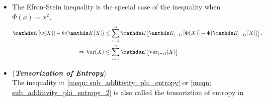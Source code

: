 \documentclass[11pt]{article}
\begin{document}
\begin{itemize}
\begin{proof}
\begin{align*}
\text{Ent}(X)&:= \E{}{X\log X} - \E{}{X}\log\paren{\E{}{X}} = \kl{P}{Q}
\end{align*} which, by Han's inequality for relative entropy
\begin{align*}
\text{Ent}(X) = \kl{P}{Q}& \le \sum_{i=1}^{n}\paren{\kl{P}{Q} - \kl{P_{(-i)}}{Q_{(-i)}}} 
\end{align*} However, straightforward calculation shows that
\begin{align*}
\sum_{i=1}^{n}\paren{\kl{P}{Q} - \kl{P_{(-i)}}{Q_{(-i)}}} &=  \sum_{i=1}^{n}\E{}{\E{(-i)}{\Phi(X)} - \Phi(\E{(-i)}{X})}
\end{align*} and the statement follows. \qed
\end{proof}

\item \begin{remark}
The Efron-Stein inequality is the special case of the inequality when $\Phi(x) = x^2$,
\begin{align*}
\E{}{\Phi(X)} - \Phi(\E{}{X}) &\le \sum_{i=1}^{n}\E{}{\E{(-i)}{\Phi(X)} - \Phi(\E{(-i)}{X})}.\\
\Rightarrow \text{Var}(X) &\le \sum_{i=1}^{n}\E{}{\text{Var}_{(-i)}(X)}
\end{align*} 
\end{remark}

\item \begin{remark} (\textbf{\emph{Tensorization of Entropy}})\\
The inequality in \eqref{ineqn: sub_additivity_phi_entropy} or \ref{ineqn: sub_additivity_phi_entropy_2} is also called the tensoriztion of entropy in \citep{wainwright2019high}
\end{remark}


\end{itemize}
\end{document}
